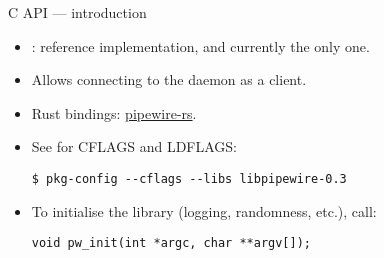 \begin{frame}[fragile]{C API — introduction}
  \begin{itemize}

  \item {}: reference implementation, and currently the only one.

  \item Allows connecting to the daemon as a client.

  \item Rust bindings:
    \href{https://gitlab.freedesktop.org/pipewire/pipewire-rs}{pipewire-rs}.

  \item See  for CFLAGS and LDFLAGS:

    \begin{verbatim}
$ pkg-config --cflags --libs libpipewire-0.3
    \end{verbatim}

  \item To initialise the library (logging, randomness, etc.), call:
    \begin{verbatim}
void pw_init(int *argc, char **argv[]);
    \end{verbatim}

  \end{itemize}
\end{frame}



